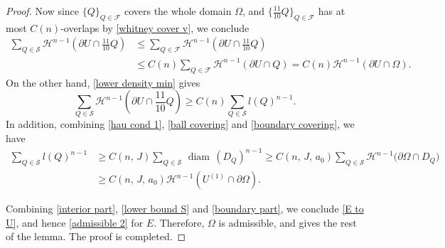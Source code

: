 \documentclass[reqno,11pt]{amsart}
\def\diam{{\mathop\mathrm{\,diam\,}}}
\numberwithin{equation}{section}
\theoremstyle{remark}
\begin{document}
\begin{proof}
Now since $\{Q\}_{Q\in \mathscr F}$ covers the whole domain $\Omega$, and $\{\frac {11}{10} Q\}_{Q\in \mathscr F}$ has at most $C(n)$-overlaps by \eqref{whitney cover v},  we conclude 
\begin{align}
       \sum_{Q\in \mathscr S}\mathcal{H}^{n-1}\left(\partial U\cap \frac{11}{10}Q\right)&\le    \sum_{Q\in \mathscr{F}}\mathcal{H}^{n-1}\left(\partial U\cap \frac{11}{10}Q\right) \nonumber \\
   &\le C(n) \sum_{Q\in \mathscr{F}}\mathcal{H}^{n-1}(\partial U\cap  Q)=C(n)  \mathcal{H}^{n-1}(\partial U\cap \Omega).\label{interior part}
\end{align}
On the other hand, \eqref{lower density min}
gives 
\begin{equation}\label{lower bound S}
  \sum_{Q\in \mathscr S}\mathcal{H}^{n-1}\left(\partial U\cap \frac{11}{10}Q\right)\ge C(n)\sum_{Q\in \mathscr S }l(Q)^{n-1}.   
\end{equation}
In addition, combining \eqref{hau cond 1}, \eqref{ball covering} and  \eqref{boundary covering}, we have
\begin{align}
    \sum_{Q\in \mathscr S }l(Q)^{n-1}& \ge C(n,\,J)\sum_{Q\in \mathscr S }\diam(D_Q)^{n-1} \ge C(n,\,J,\,a_0)\sum_{Q\in \mathscr S } \mathcal{H}^{n-1}\big(\partial\Omega \cap D_Q\big)\nonumber \\
    &\ge   C(n,\,J,\,a_0)\mathcal{H}^{n-1}(U^{(1)}\cap \partial \Omega).\label{boundary part}
\end{align}


Combining \eqref{interior part}, \eqref{lower bound S} and \eqref{boundary part}, we conclude \eqref{E to U}, and hence \eqref{admissible 2} for $E$. Therefore, $\Omega$ is admissible, and \cite[Theorem 5.14.4]{Z1989} gives the rest of the lemma. 
 The proof is completed.
\end{proof}
\end{document}
